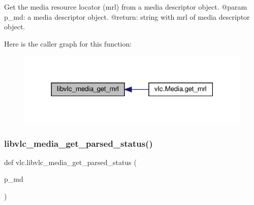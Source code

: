 \begin{DoxyVerb}Get the media resource locator (mrl) from a media descriptor object.
@param p_md: a media descriptor object.
@return: string with mrl of media descriptor object.
\end{DoxyVerb}
 Here is the caller graph for this function\+:
\nopagebreak
\begin{figure}[H]
\begin{center}
\leavevmode
\includegraphics[width=318pt]{namespacevlc_aafa8b7a81c78b84c54b79a80aa1fc63f_icgraph}
\end{center}
\end{figure}
\mbox{\label{namespacevlc_a54f57e0bca8341f88e32cc2eb5b2b419}} 
\subsubsection{\texorpdfstring{libvlc\+\_\+media\+\_\+get\+\_\+parsed\+\_\+status()}{libvlc\_media\_get\_parsed\_status()}}
{\footnotesize\ttfamily def vlc.\+libvlc\+\_\+media\+\_\+get\+\_\+parsed\+\_\+status (\begin{DoxyParamCaption}\item[{}]{p\+\_\+md }\end{DoxyParamCaption})}


